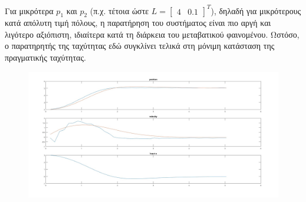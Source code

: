 \documentclass[12pt]{article}
\begin{document}
Για μικρότερα \(p_1\) και \(p_2\) (π.χ. τέτοια ώστε \(L = \begin{bmatrix}
    4 & 0.1
\end{bmatrix}^T\)), δηλαδή για μικρότερους κατά απόλυτη τιμή πόλους, η παρατήρηση του συστήματος είναι πιο αργή και λιγότερο αξιόπιστη, ιδιαίτερα κατά τη διάρκεια του μεταβατικού φαινομένου. Ωστόσο, ο παρατηρητής της ταχύτητας εδώ συγκλίνει τελικά στη μόνιμη κατάσταση της πραγματικής ταχύτητας. 
\begin{figure}[H]
    \centering
    \includegraphics*[scale=0.25]{lab4b_lowgains_all.jpg}
\end{figure}
\end{document}
